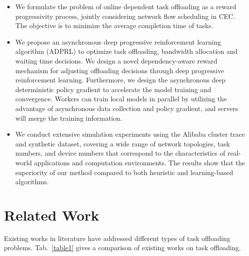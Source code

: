 \documentclass[10pt, conference, letterpaper]{IEEEtran}
\begin{document}
\begin{itemize}
    \item We formulate the problem of online dependent task offloading as a reward progressivity process, jointly considering network flow scheduling in CEC. The objective is to minimize the average completion time of tasks. 
    
    \item We propose an asynchronous deep progressive reinforcement learning algorithm (ADPRL) to optimize task offloading, bandwidth allocation and waiting time decisions. We design a novel dependency-aware reward mechanism for adjusting offloading decisions through deep progressive reinforcement learning. Furthermore, we design the asynchronous deep deterministic policy gradient to accelerate the model training and convergence. Workers can train local models in parallel by utilizing the advantage of asynchronous data collection and policy gradient, and servers will merge the training information.

    
    \item We conduct extensive simulation experiments using the Alibaba cluster trace and synthetic dataset, covering a wide range of network topologies, task numbers, and device numbers that correspond to the characteristics of real-world applications and computation environments. The results show that the superiority of our method compared to both heuristic and learning-based algorithms.
    
\end{itemize}

\section{Related Work}\label{sec:related-work}
Existing works in literature have addressed different types of task offloading problems. Tab.~\ref{table1} gives a comparison of existing works on task offloading. 
\end{document}
